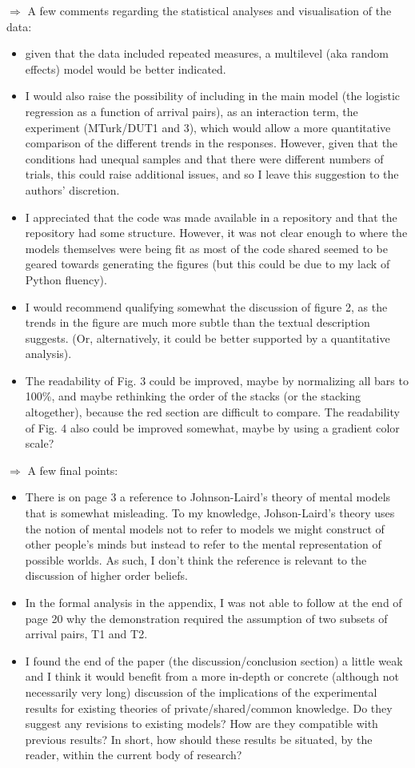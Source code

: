 \documentclass{article}
\begin{document}
$\Rightarrow$ A few comments regarding the statistical analyses and visualisation of the data:
\begin{itemize}
\item given that the data included repeated measures, a multilevel (aka random effects) model would be better indicated.
\item I would also raise the possibility of including in the main model (the logistic regression as a function of arrival pairs), as an interaction term, the experiment (MTurk/DUT1 and 3), which would allow a more quantitative comparison of the different trends in the responses. However, given that the conditions had unequal samples and that there were different numbers of trials, this could raise additional issues, and so I leave this suggestion to the authors' discretion.
\item I appreciated that the code was made available in a repository and that the repository had some structure. However, it was not clear enough to where the models themselves were being fit as most of the code shared seemed to be geared towards generating the figures (but this could be due to my lack of Python fluency).
\item I would recommend qualifying somewhat the discussion of figure 2, as the trends in the figure are much more subtle than the textual description suggests. (Or, alternatively, it could be better supported by a quantitative analysis).
\item The readability of Fig. 3 could be improved, maybe by normalizing all bars to 100\%, and maybe rethinking the order of the stacks (or the stacking altogether), because the red section are difficult to compare. The readability of Fig. 4 also could be improved somewhat, maybe by using a gradient color scale?
\end{itemize}

$\Rightarrow$ A few final points:
\begin{itemize}
\item  There is on page 3 a reference to Johnson-Laird's theory of mental models that is somewhat misleading. To my knowledge, Johson-Laird's theory uses the notion of mental models not to refer to models we might construct of other people's minds but instead to refer to the mental representation of possible worlds. As such, I don't think the reference is relevant to the discussion of higher order beliefs.
\item In the formal analysis in the appendix, I was not able to follow at the end of page 20 why the demonstration required the assumption of two subsets of arrival pairs, T1 and T2.
\item I found the end of the paper (the discussion/conclusion section) a little weak and I think it would benefit from a more in-depth or concrete (although not necessarily very long) discussion of the implications of the experimental results for existing theories of private/shared/common knowledge. Do they suggest any revisions to existing models? How are they compatible with previous results? In short, how should these results be situated, by the reader, within the current body of research?
\end{itemize}
\end{document}
